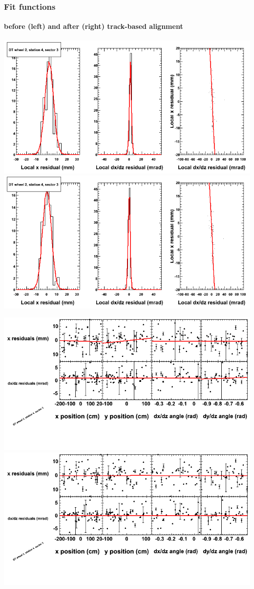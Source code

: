 \documentclass[compress]{beamer}
\begin{document}
\begin{frame}
\frametitle{Fit functions}
\framesubtitle{before (left) and after (right) track-based alignment}
\includegraphics[width=0.5\linewidth]{fitfunctions_re01/MBwhEst4sec03_bellcurves.png} \includegraphics[width=0.5\linewidth]{fitfunctions_re05/MBwhEst4sec03_bellcurves.png}

\includegraphics[width=0.5\linewidth]{fitfunctions_re01/MBwhEst4sec03_polynomials.png} \includegraphics[width=0.5\linewidth]{fitfunctions_re05/MBwhEst4sec03_polynomials.png}
\end{frame}
\end{document}

